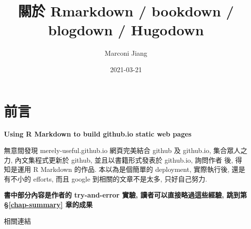 \documentclass[
]{book}
\title{關於 Rmarkdown / bookdown / blogdown / Hugodown}
\author{Marconi Jiang}
\date{2021-03-21}
\begin{document}
\maketitle

{
\setcounter{tocdepth}{1}
\tableofcontents
}
\hypertarget{ux524dux8a00}{%
\chapter{前言}\label{ux524dux8a00}}

\textbf{Using R Markdown to build github.io static web pages}

無意間發現 merely-useful.github.io 網頁完美結合 github 及 github.io, 集合眾人之力, 內文集程式更新於 github, 並且以書籍形式發表於 github.io, 詢問作者 後, 得知是運用 R Markdown 的作品. 本以為是個簡單的 deployment, 實際執行後, 還是有不小的 efforts, 而且 google 到相關的文章不是太多, 只好自己努力.

\textbf{書中部分內容是作者的 try-and-error 實驗, 讀者可以直接略過這些經驗, 跳到第 §\ref{chap-summary} 章的成果}

相關連結
\end{document}
